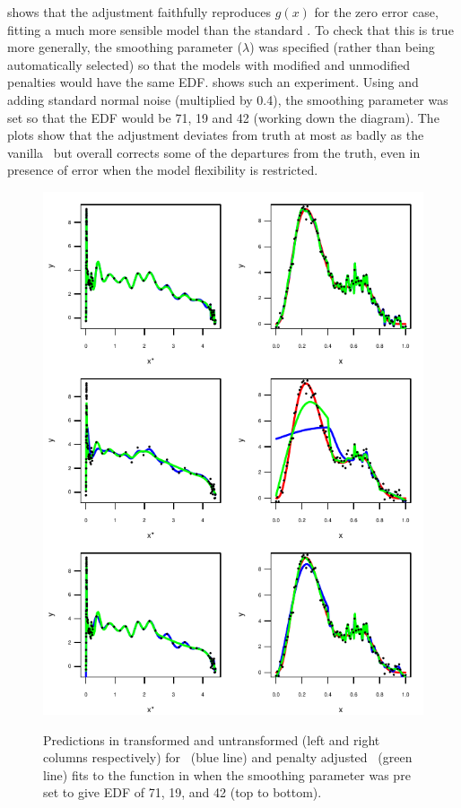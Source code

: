  shows that the adjustment faithfully reproduces $g(x)$ for the zero error case, fitting a much more sensible model than the standard \tprs. To check that this is true more generally, the smoothing parameter ($\lambda$) was specified (rather than being automatically selected) so that the models with modified and unmodified penalties would have the same EDF.  shows such an experiment. Using  and adding standard normal noise (multiplied by 0.4), the smoothing parameter was set so that the EDF would be 71, 19 and 42 (working down the diagram). The plots show that the adjustment deviates from truth at most as badly as the vanilla \tprs\ but overall corrects some of the departures from the truth, even in presence of error when the model flexibility is restricted.

\begin{figure}
\centering
\includegraphics[width=5.5in]{mds/figs/1dedfdia.pdf} \\
\caption{Predictions in transformed and untransformed (left and right columns respectively) for \tprs\ (blue line) and penalty adjusted \tprs\ (green line) fits to the function in  when the smoothing parameter was pre set to give EDF of 71, 19, and 42 (top to bottom).}
\label{1dedfdia}
\end{figure}


